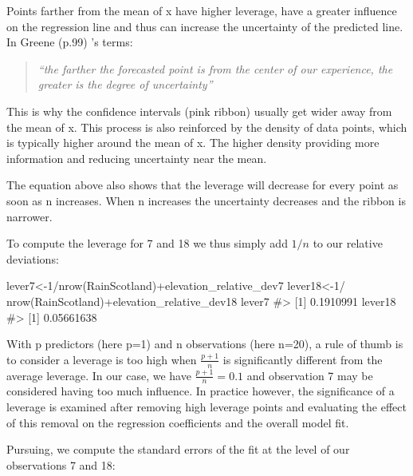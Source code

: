 \documentclass[
  letterpaper,
  DIV=11,
  numbers=noendperiod]{scrreprt}
\newenvironment{Shaded}{\begin{snugshade}}{\end{snugshade}}
\newcommand{\CommentTok}[1]{\textcolor[rgb]{0.37,0.37,0.37}{#1}}
\newcommand{\DecValTok}[1]{\textcolor[rgb]{0.68,0.00,0.00}{#1}}
\newcommand{\FunctionTok}[1]{\textcolor[rgb]{0.28,0.35,0.67}{#1}}
\newcommand{\NormalTok}[1]{\textcolor[rgb]{0.00,0.23,0.31}{#1}}
\newcommand{\OtherTok}[1]{\textcolor[rgb]{0.00,0.23,0.31}{#1}}
\newcommand{\SpecialCharTok}[1]{\textcolor[rgb]{0.37,0.37,0.37}{#1}}
\begin{document}
Points farther from the mean of x have higher leverage, have a greater
influence on the regression line and thus can increase the uncertainty
of the predicted line. In Greene (p.99) 's terms:

\begin{quote}
\emph{``the farther the forecasted point is from the center of our
experience, the greater is the degree of uncertainty''}
\end{quote}

This is why the confidence intervals (pink ribbon) usually get wider
away from the mean of x. This process is also reinforced by the density
of data points, which is typically higher around the mean of x. The
higher density providing more information and reducing uncertainty near
the mean.

The equation above also shows that the leverage will decrease for every
point as soon as n increases. When n increases the uncertainty decreases
and the ribbon is narrower.

To compute the leverage for 7 and 18 we thus simply add \(1/n\) to our
relative deviations:

\begin{Shaded}
\begin{Highlighting}[]
\NormalTok{lever7}\OtherTok{\textless{}{-}}\DecValTok{1}\SpecialCharTok{/}\FunctionTok{nrow}\NormalTok{(RainScotland)}\SpecialCharTok{+}\NormalTok{elevation\_relative\_dev7}
\NormalTok{lever18}\OtherTok{\textless{}{-}}\DecValTok{1}\SpecialCharTok{/} \FunctionTok{nrow}\NormalTok{(RainScotland)}\SpecialCharTok{+}\NormalTok{elevation\_relative\_dev18}
\NormalTok{lever7}
\CommentTok{\#\textgreater{} [1] 0.1910991}
\NormalTok{lever18}
\CommentTok{\#\textgreater{} [1] 0.05661638}
\end{Highlighting}
\end{Shaded}

With p predictors (here p=1) and n observations (here n=20), a rule of
thumb is to consider a leverage is too high when \(\frac{p+1}{n}\) is
significantly different from the average leverage. In our case, we have
\(\frac{p+1}{n}=0.1\) and observation 7 may be considered having too
much influence. In practice however, the significance of a leverage is
examined after removing high leverage points and evaluating the effect
of this removal on the regression coefficients and the overall model
fit.

Pursuing, we compute the standard errors of the fit at the level of our
observations 7 and 18:
\end{document}

